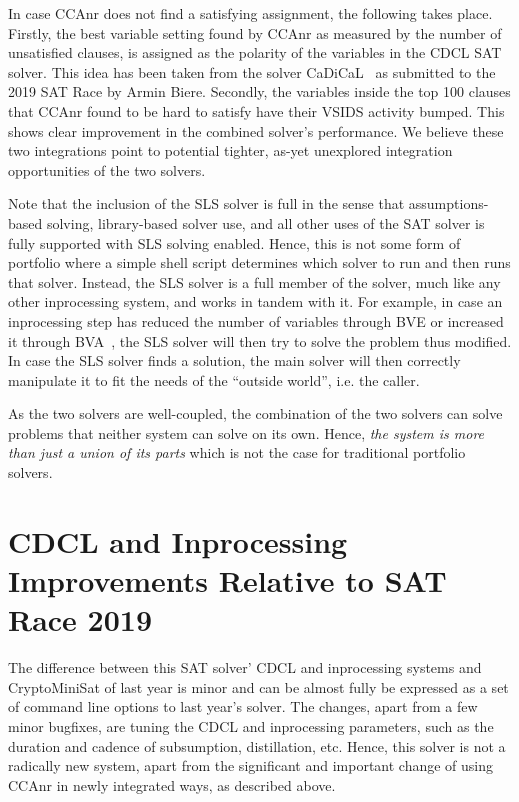 \documentclass[final]{ieee}
\begin{document}
In case CCAnr does not find a satisfying assignment, the following takes place. Firstly, the best variable setting found by CCAnr as measured by the number of unsatisfied clauses, is assigned as the polarity of the variables in the CDCL SAT solver. This idea has been taken from the solver CaDiCaL~\cite{cadical} as submitted to the 2019 SAT Race by Armin Biere. Secondly, the variables inside the top 100 clauses that CCAnr found to be hard to satisfy have their VSIDS activity bumped. This shows clear improvement in the combined solver's performance. We believe these two integrations point to potential tighter, as-yet unexplored integration opportunities of the two solvers.

Note that the inclusion of the SLS solver is full in the sense that assumptions-based solving, library-based solver use, and all other uses of the SAT solver is fully supported with SLS solving enabled. Hence, this is not some form of portfolio where a simple shell script determines which solver to run and then runs that solver. Instead, the SLS solver is a full member of the solver, much like any other inprocessing system, and works in tandem with it. For example, in case an inprocessing step has reduced the number of variables through BVE or increased it through BVA~\cite{BVA}, the SLS solver will then try to solve the problem thus modified. In case the SLS solver finds a solution, the main solver will then correctly manipulate it to fit the needs of the ``outside world'', i.e. the caller.

As the two solvers are well-coupled, the combination of the two solvers can solve problems that neither system can solve on its own. Hence, \emph{the system is more than just a union of its parts} which is not the case for traditional portfolio solvers.

\section{CDCL and Inprocessing Improvements Relative to SAT Race 2019}
The difference between this SAT solver' CDCL and inprocessing systems and CryptoMiniSat of last year is minor and can be almost fully be expressed as a set of command line options to last year's solver. The changes, apart from a few minor bugfixes, are tuning the CDCL and inprocessing parameters, such as the duration and cadence of subsumption, distillation, etc. Hence, this solver is not a radically new system, apart from the significant and important change of using CCAnr in newly integrated ways, as described above.
\end{document}
